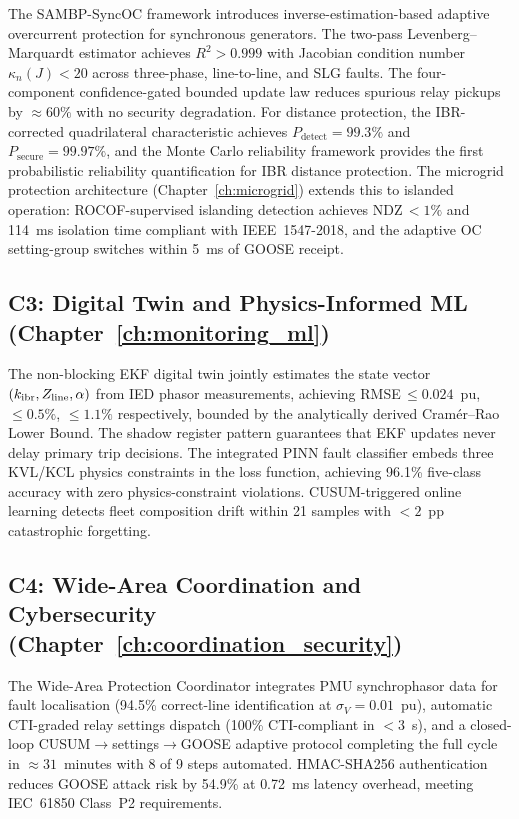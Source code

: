 The SAMBP-SyncOC framework introduces inverse-estimation-based adaptive
overcurrent protection for synchronous generators. The two-pass
Levenberg--Marquardt estimator achieves $R^2 > 0.999$ with Jacobian
condition number $\kappa_n(J) < 20$ across three-phase, line-to-line,
and SLG faults. The four-component confidence-gated bounded update law
reduces spurious relay pickups by $\approx 60\%$ with no security
degradation. For distance protection, the IBR-corrected quadrilateral
characteristic achieves $P_\mathrm{detect} = 99.3\%$ and
$P_\mathrm{secure} = 99.97\%$, and the Monte Carlo reliability framework
provides the first probabilistic reliability quantification for IBR
distance protection. The microgrid protection architecture
(Chapter~\ref{ch:microgrid}) extends this to islanded operation:
ROCOF-supervised islanding detection achieves NDZ\,$< 1\%$ and 114~ms
isolation time compliant with IEEE~1547-2018, and the adaptive OC
setting-group switches within 5~ms of GOOSE receipt.

\subsection{C3: Digital Twin and Physics-Informed ML (Chapter~\ref{ch:monitoring_ml})}

The non-blocking EKF digital twin jointly estimates the state vector
$(k_\mathrm{ibr}, Z_\mathrm{line}, \alpha)$ from IED phasor measurements, achieving
RMSE\,$\leq 0.024$~pu, $\leq 0.5\%$, $\leq 1.1\%$ respectively,
bounded by the analytically derived Cramér--Rao Lower Bound. The shadow
register pattern guarantees that EKF updates never delay primary trip
decisions. The integrated PINN fault classifier embeds three KVL/KCL
physics constraints in the loss function, achieving 96.1\% five-class
accuracy with zero physics-constraint violations. CUSUM-triggered online
learning detects fleet composition drift within 21 samples with
$< 2$~pp catastrophic forgetting.

\subsection{C4: Wide-Area Coordination and Cybersecurity (Chapter~\ref{ch:coordination_security})}

The Wide-Area Protection Coordinator integrates PMU synchrophasor data
for fault localisation (94.5\% correct-line identification at
$\sigma_V = 0.01$~pu), automatic CTI-graded relay settings dispatch
(100\% CTI-compliant in $< 3$~s), and a closed-loop
CUSUM$\to$settings$\to$GOOSE adaptive protocol completing the full
cycle in $\approx 31$~minutes with 8 of 9 steps automated.
HMAC-SHA256 authentication reduces GOOSE attack risk by 54.9\%
at 0.72~ms latency overhead, meeting IEC~61850 Class~P2 requirements.

